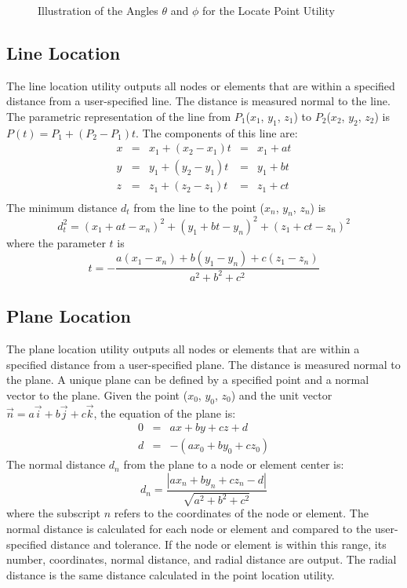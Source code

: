 \begin{figure}
\caption{Illustration of the Angles $\theta$ and $\phi$
for the Locate Point Utility}\label{f:theta}
\end{figure}
  
\subsection{Line Location}\label{sec:llocate}
The line location utility outputs all nodes or elements that are within
a specified distance from a user-specified line.  The distance is
measured normal to the line.   The parametric representation of the line
from $P_1$($x_1$, $y_1$, $z_1$) to $P_2$($x_2$, $y_2$, $z_2$) is $P(t) =
P_1 + (P_2 - P_1)t$.  The components of this line are: 
\begin{equation}
\begin{array}{ccccc}
x &=& x_1 + (x_2 - x_1) t &=& x_1 + at   \\
y &=& y_1 + (y_2 - y_1) t &=& y_1 + bt   \\
z &=& z_1 + (z_2 - z_1) t &=& z_1 + ct   \\
\end{array}
\end{equation}
The minimum distance $d_t$ from the line to the point ($x_n$, $y_n$, $z_n$) 
is
\begin{equation}
d_t^2 = (x_1+at-x_n)^2 +(y_1+bt-y_n)^2 +(z_1+ct-z_n)^2 
\end{equation}
where the parameter $t$ is 
\begin{equation}
t = -\frac{a(x_1-x_n) + b(y_1-y_n) +
c(z_1-z_n)}{a^2+b^2+c^2}\label{parametric}
\end{equation}
  
\subsection{Plane Location}\label{sec:slocate}
The plane location utility outputs all nodes or elements that are within
a specified distance from a user-specified plane.  The distance is
measured normal to the plane. A unique plane can be defined by a
specified point and a normal vector to the plane.  Given the point
($x_0$, $y_0$, $z_0$) and the unit vector $\vec{n} = a\vec{i} + b\vec{j} +
c\vec{k}$, the equation of the plane is: 
\begin{eqnarray}
0 &=& ax + by + cz + d      \label{plane} \\
d &=& -( ax_0 + by_0 + cz_0 )
\end{eqnarray}
The normal distance $d_n$ from the plane to a node or
element center is: 
\begin{equation}
d_n = \frac{\left| a x_n + b y_n + c z_n - d\right|}%
                                    {\sqrt{a^2 + b^2 + c^2}} 
\end{equation}
where the subscript $n$ refers to the coordinates of the node or
element.  The normal distance is calculated for each node or element and
compared to the user-specified distance and tolerance.  If the node or
element is within this range, its number, coordinates, normal distance,
and radial distance are output.  The radial distance is the same
distance calculated in the point location utility. 

